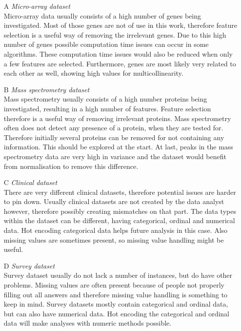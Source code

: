 \documentclass[10pt,a4paper]{report}
\begin{document}
	\begin{enumerate}
		\item[A] \textit{Micro-array dataset} \\
		Micro-array data usually consists of a high number of genes being investigated. Most of those genes are not of use in this work, therefore feature selection is a useful way of removing the irrelevant genes. Due to this high number of genes possible computation time issues can occur in some algorithms. These computation time issues would also be reduced when only a few features are selected. Furthermore, genes are most likely very related to each other as well, showing high values for multicollinearity. 
		\item[B] \textit{Mass spectrometry dataset} \\
		Mass spectrometry usually consists of a high number proteins being investigated, resulting in a high number of features. Feature selection therefore is a useful way of removing irrelevant proteins. Mass spectrometry often does not detect any presence of a protein, when they are tested for. Therefore initially several proteins can be removed for not containing any information. This should be explored at the start. At last, peaks in the mass spectrometry data are very high in variance and the dataset would benefit from normalisation to remove this difference.
		\item[C] \textit{Clinical dataset} \\
		There are very different clinical datasets, therefore potential issues are harder to pin down. Usually clinical datasets are not created by the data analyst however, therefore possibly creating mismatches on that part. The data types within the dataset can be different, having categorical, ordinal and numerical data. Hot encoding categorical data helps future analysis in this case. Also missing values are sometimes present, so missing value handling might be useful. 
		\item[D] \textit{Survey dataset} \\
		Survey dataset usually do not lack a number of instances, but do have other problems. Missing values are often present because of people not properly filling out all answers and therefore missing value handling is something to keep in mind. Survey datasets mostly contain categorical and ordinal data, but can also have numerical data. Hot encoding the categorical and ordinal data will make analyses with numeric methods possible. 
	\end{enumerate}
	
\end{document}
